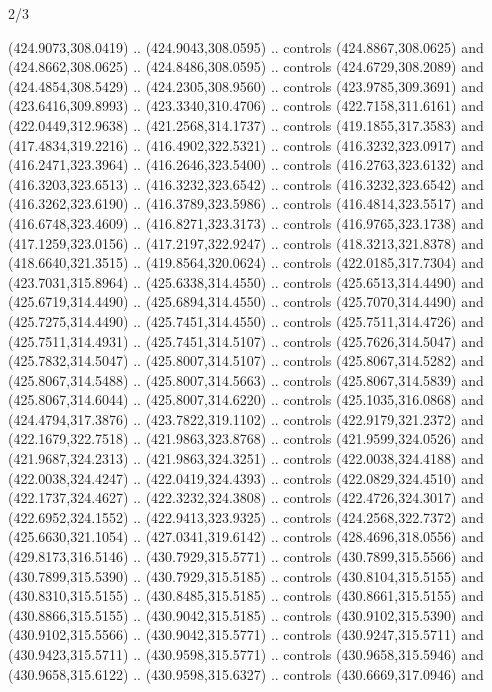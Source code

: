 \begin{flagdescription}{2/3}
\begin{scope}[xshift=0.5\flaglength,yshift=0.5\flagwidth,scale=\flagwidth/495.65]
\begin{scope}[y=0.8pt, x=0.8pt, yscale=-1,shift={(-463.76,-309.78)}]
  (424.9073,308.0419) .. (424.9043,308.0595) .. controls (424.8867,308.0625) and
  (424.8662,308.0625) .. (424.8486,308.0595) .. controls (424.6729,308.2089) and
  (424.4854,308.5429) .. (424.2305,308.9560) .. controls (423.9785,309.3691) and
  (423.6416,309.8993) .. (423.3340,310.4706) .. controls (422.7158,311.6161) and
  (422.0449,312.9638) .. (421.2568,314.1737) .. controls (419.1855,317.3583) and
  (417.4834,319.2216) .. (416.4902,322.5321) .. controls (416.3232,323.0917) and
  (416.2471,323.3964) .. (416.2646,323.5400) .. controls (416.2763,323.6132) and
  (416.3203,323.6513) .. (416.3232,323.6542) .. controls (416.3232,323.6542) and
  (416.3262,323.6190) .. (416.3789,323.5986) .. controls (416.4814,323.5517) and
  (416.6748,323.4609) .. (416.8271,323.3173) .. controls (416.9765,323.1738) and
  (417.1259,323.0156) .. (417.2197,322.9247) .. controls (418.3213,321.8378) and
  (418.6640,321.3515) .. (419.8564,320.0624) .. controls (422.0185,317.7304) and
  (423.7031,315.8964) .. (425.6338,314.4550) .. controls (425.6513,314.4490) and
  (425.6719,314.4490) .. (425.6894,314.4550) .. controls (425.7070,314.4490) and
  (425.7275,314.4490) .. (425.7451,314.4550) .. controls (425.7511,314.4726) and
  (425.7511,314.4931) .. (425.7451,314.5107) .. controls (425.7626,314.5047) and
  (425.7832,314.5047) .. (425.8007,314.5107) .. controls (425.8067,314.5282) and
  (425.8067,314.5488) .. (425.8007,314.5663) .. controls (425.8067,314.5839) and
  (425.8067,314.6044) .. (425.8007,314.6220) .. controls (425.1035,316.0868) and
  (424.4794,317.3876) .. (423.7822,319.1102) .. controls (422.9179,321.2372) and
  (422.1679,322.7518) .. (421.9863,323.8768) .. controls (421.9599,324.0526) and
  (421.9687,324.2313) .. (421.9863,324.3251) .. controls (422.0038,324.4188) and
  (422.0038,324.4247) .. (422.0419,324.4393) .. controls (422.0829,324.4510) and
  (422.1737,324.4627) .. (422.3232,324.3808) .. controls (422.4726,324.3017) and
  (422.6952,324.1552) .. (422.9413,323.9325) .. controls (424.2568,322.7372) and
  (425.6630,321.1054) .. (427.0341,319.6142) .. controls (428.4696,318.0556) and
  (429.8173,316.5146) .. (430.7929,315.5771) .. controls (430.7899,315.5566) and
  (430.7899,315.5390) .. (430.7929,315.5185) .. controls (430.8104,315.5155) and
  (430.8310,315.5155) .. (430.8485,315.5185) .. controls (430.8661,315.5155) and
  (430.8866,315.5155) .. (430.9042,315.5185) .. controls (430.9102,315.5390) and
  (430.9102,315.5566) .. (430.9042,315.5771) .. controls (430.9247,315.5711) and
  (430.9423,315.5711) .. (430.9598,315.5771) .. controls (430.9658,315.5946) and
  (430.9658,315.6122) .. (430.9598,315.6327) .. controls (430.6669,317.0946) and

\end{scope}
\end{scope}
\end{flagdescription}
